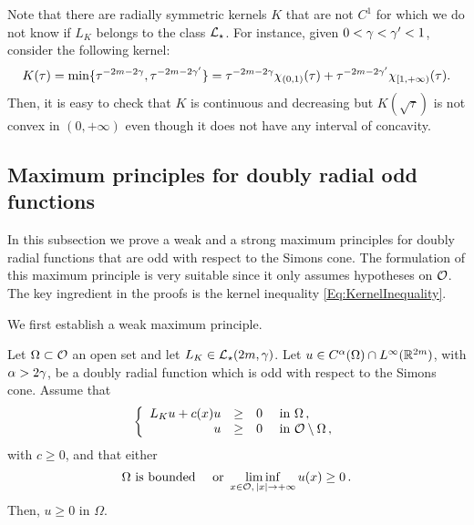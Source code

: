 \begin{remark}
	Note that there are radially symmetric kernels $K$ that are not $C^1$ for which we do not know if $L_K$ belongs to the class $\mathcal{L}_\star$. For instance, given $0<\gamma<\gamma'<1$, consider the following kernel:
	$$ K(\tau) = \min\{\tau^{-2m-2\gamma},\tau^{-2m-2\gamma'}\} = \tau^{-2m-2\gamma} \chi_{(0,1)}(\tau)+\tau^{-2m-2\gamma'} \chi_{[1,+\infty)}(\tau). $$
	Then, it is easy to check that $K$ is continuous and decreasing but $K(\sqrt{\tau})$ is not convex in $(0,+\infty)$ even though it does not have any interval of concavity.
\end{remark}

\subsection{Maximum principles for doubly radial odd functions}

In this subsection we prove a weak and a strong maximum principles for doubly radial functions that are odd with respect to the Simons cone. The formulation of this maximum principle is very suitable since it only assumes hypotheses on $\mathcal{O}$. The key ingredient in the proofs is the kernel inequality \eqref{Eq:KernelInequality}.


We first establish a weak maximum principle.

\begin{proposition}
\label{Prop:WeakMaximumPrincipleForOddFunctions} Let $\Omega \subset \mathcal{O}$ an open set and let $L_K  \in \mathcal{L}_\star (2m,  \gamma)$.  Let $u\in C^{\alpha}(\Omega)\cap L^\infty(\mathbb{R}^{2m})$, with $\alpha > 2\gamma$, be a doubly radial function which is odd with respect to the Simons cone. Assume that
$$
\left\{\begin{array}{rcll}
L_K u + c(x) u & \geq & 0 & \text{ in } \Omega\,,\\
u & \geq & 0 & \text{ in } \mathcal{O} \setminus \Omega\,,
\end{array} \right.
$$
with $c \geq 0$, and that either
$$
\Omega \text{ is bounded} \quad \text{ or } \liminf_{x \in \mathcal{O},\,|x|\to +\infty} u(x) \geq 0\,.
$$
Then, $u \geq 0$ in $\Omega$.
\end{proposition}

